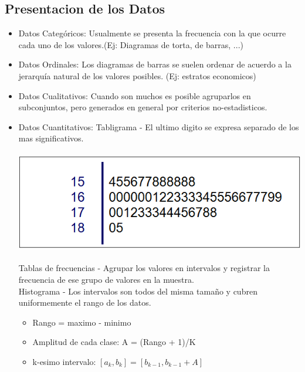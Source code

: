 	\subsection{Presentacion de los Datos}
		\begin{itemize}
			\item Datos Categ\'oricos: Usualmente se presenta la frecuencia con la que ocurre cada uno de los valores.(Ej: Diagramas de torta, de barras, ...)
			\item Datos Ordinales: Los diagramas de barras se suelen ordenar de acuerdo a la jerarqu\'ia natural de los valores posibles. (Ej: estratos economicos)
			\item Datos Cualitativos: Cuando son muchos es posible agruparlos en subconjuntos, pero generados en general por criterios no-estadisticos.
			\item Datos Cuantitativos: Tabligrama - El ultimo digito se expresa separado de los mas significativos.\\ \\
			\includegraphics[scale=0.3]{images/tabligrama}
			\\ \\Tablas de frecuencias - Agrupar los valores en intervalos y registrar la frecuencia de ese grupo de valores en la muestra.\\
			Histograma - Los intervalos son todos del misma tama\~no y cubren uniformemente el rango de los datos.\\
			\begin{itemize}
				\item Rango = maximo - minimo
				\item Amplitud de cada clase: A = (Rango + 1)/K
				\item k-esimo intervalo: $[a_k,b_k] = [b_{k-1},b_{k-1}+A]  $
			\end{itemize}
		\end{itemize}
